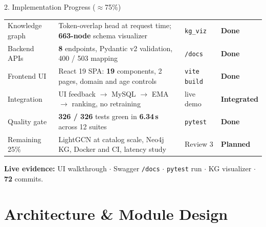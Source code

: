 \documentclass[aspectratio=169, 11pt]{beamer}
\newcommand{\sOK}{\textcolor{amritaTeal}{\textbf{Done}}}
\newcommand{\sINT}{\textcolor{amritaTeal}{\textbf{Integrated}}}
\newcommand{\sPLN}{\textcolor{amritaSlate}{\textbf{Planned}}}
\begin{document}
\begin{frame}[shrink]{2. Implementation Progress ($\approx$75\%)}
\begin{center}
{\begin{tabular}{p{1.9cm} p{7.5cm} p{1.35cm} l}
Knowledge graph & Token-overlap head at request time; \textbf{663-node} schema visualizer                 & \texttt{kg\_viz}     & \sOK\\
Backend APIs    & \textbf{8} endpoints, Pydantic v2 validation, 400 / 503 mapping                        & \texttt{/docs}       & \sOK\\
Frontend UI     & React 19 SPA: \textbf{19} components, 2 pages, domain and age controls                 & \texttt{vite build}  & \sOK\\
Integration     & UI feedback $\rightarrow$ MySQL $\rightarrow$ EMA $\rightarrow$ ranking, no retraining  & live demo            & \sINT\\
Quality gate    & \textbf{326 / 326} tests green in \textbf{6.34\,s} across 12 suites                    & \texttt{pytest}      & \sOK\\
\midrule
Remaining 25\%  & LightGCN at catalog scale, Neo4j KG, Docker and CI, latency study                      & Review 3             & \sPLN\\
\bottomrule
\end{tabular}}
\end{center}
\vspace{1.5mm}
{\scriptsize\textbf{Live evidence:} UI walkthrough $\cdot$ Swagger \texttt{/docs} $\cdot$ \texttt{pytest} run $\cdot$ KG visualizer $\cdot$ \textbf{72} commits.}
\end{frame}


\section{Architecture \& Module Design}
\end{document}
